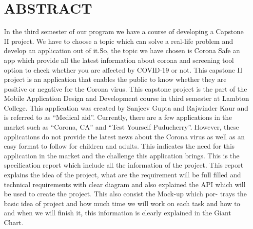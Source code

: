 \section *{\LARGE ABSTRACT}
In the third semester of our program we have a course of developing a Capstone II project. We have to choose a topic which can solve a real-life problem and develop an application out of it.So, the topic we have chosen is Corona Safe an app which provide all the latest information about corona and screening tool option to check whether you are affected by COVID-19 or not.
This capstone II project is an application that enables the public to know whether they are positive or negative for the Corona virus. This capstone project is the part of the Mobile Application Design and Development course in third semester at Lambton College. This application was created by Sanjeev Gupta and Rajwinder Kaur and is referred to as “Medical aid”. Currently, there are a few applications in the market such as “Corona, CA” and “Test Yourself Puducherry”. However, these applications do not provide the latest news about the Corona virus as well as an easy format to follow for children and adults. This indicates the need for this application in the market and the challenge this application brings. 
This is the specification report which include all the information of the project. This report explains the idea of the project, what are the requirement will be full filled and technical requirements with clear diagram and also explained the API which will be used to create the project. This also consist the Mock-up which por- trays the basic idea of project and how much time we will work on each task and how to and when we will finish it, this information is clearly explained in the Giant Chart.

